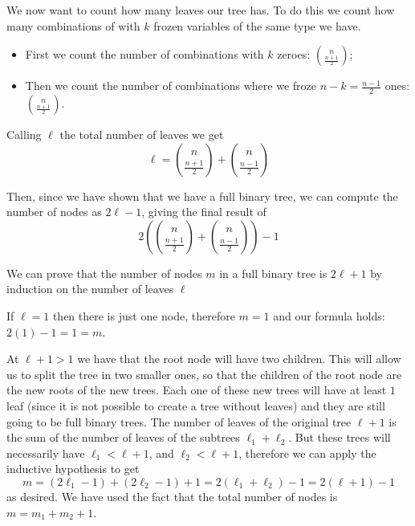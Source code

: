 \documentclass[12pt]{extarticle}
\numberwithin{equation}{section}
\begin{document}
We now want to count how many leaves our tree has. To do this we count how many combinations of with
$k$ frozen variables of the same type we have.
\begin{itemize}
	\item First we count the number of combinations with $k$ zeroes: $\binom{n}{\frac{n+1}{2}}$;
	\item Then we count the number of combinations where we froze $n - k = \frac{n-1}{2}$ ones:
	      $\binom{n}{\frac{n+1}{2}}$.
\end{itemize}
Calling $\ell$ the total number of leaves we get
\begin{equation}
	\ell = \binom{n}{\frac{n+1}{2}} + \binom{n}{\frac{n-1}{2}}
\end{equation}

Then, since we have shown that we have a full binary tree, we can compute the number of nodes as
$2 \ell -1$, giving the final result of
\begin{equation}
	2 \left(\binom{n}{\frac{n+1}{2}} + \binom{n}{\frac{n-1}{2}} \right) -1
\end{equation}

We can prove that the number of nodes $m$ in a full binary tree is $2 \ell + 1$ by induction on the
number of leaves $\ell$
\begin{description}[font=\normalfont\itshape]
	\item[Base case] If $\ell = 1$ then there is just one node, therefore $m = 1$ and our formula
	      holds: $2(1) -1 = 1 = m$.
	\item[Inductive step] At $\ell + 1 > 1$ we have that the root node will have two children.
	      This will allow us to split the tree in two smaller ones, so that the children of the root
	      node are the new roots of the new trees. Each one of these new trees will have at least $1$
	      leaf (since it is not possible to create a tree without leaves) and they are still going to
	      be full binary trees.
	      The number of leaves of the original tree $\ell + 1$ is the sum of the number of leaves of the
	      subtrees $\ell_1 + \ell_2$. But these trees will necessarily have $\ell_1 < \ell + 1$, and
	      $\ell_2 < \ell + 1$, therefore we can apply the inductive hypothesis to get
	      \begin{equation}
		      m = (2 \ell_1 - 1) + (2 \ell_2 - 1) + 1 = 2 (\ell_1 + \ell_2) - 1 = 2 (\ell + 1) -1
	      \end{equation}
	      as desired. We have used the fact that the total number of nodes is $m = m_1 + m_2 + 1$.
\end{description}
\end{document}
